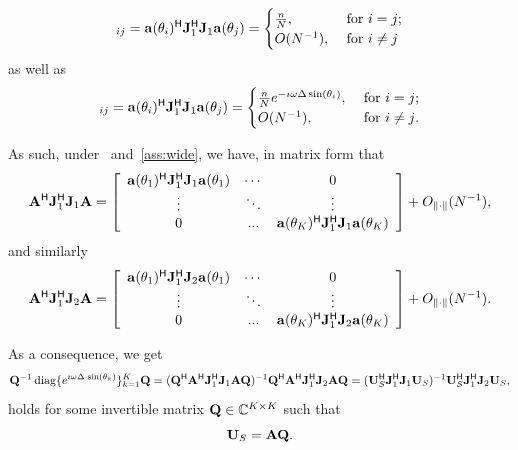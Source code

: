 \documentclass[11pt,a4paper]{article}
\begin{document}


\begin{equation}
    [\A^\H \J_1^\H \J_1 \A]_{ij} = \mathbf{a}(\theta_i)^\H \J_1^\H \J_1 \mathbf{a}(\theta_j) = \begin{cases}
        \frac{n}N, &~\text{for $i = j$}; \\ 
        O(N^{-1}), &~\text{for $i \neq j$}
    \end{cases}
\end{equation}
as well as
\begin{equation}
    [\A^\H \J_1^\H \J_2 \A]_{ij} = \mathbf{a}(\theta_i)^\H \J_1^\H \J_1 \mathbf{a}(\theta_j) = \begin{cases}
        \frac{n}N e^{-\imath \omega \Delta \sin(\theta_i)}, &~\text{for $i = j$}; \\ 
        O(N^{-1}), &~\text{for $i \neq j$}.
    \end{cases}
\end{equation}

As such, under ~and~\ref{ass:wide}, we have, in matrix form that 
\begin{equation}
 {\mathbf{A}}^{\sf H} {\mathbf{J}}_1^{\sf H} {\mathbf{J}}_1 {\mathbf{A}} = 
 \left[
 \begin{array}{ccc}
     \mathbf{a}(\theta_1)^{\sf H} {\mathbf{J}}_1^{\sf H} {\mathbf{J}}_1 \mathbf{a}(\theta_1) & \cdots & 0\\
     \vdots & \ddots &  \vdots\\
     0 & ... & \mathbf{a}(\theta_K)^{\sf H} {\mathbf{J}}_1^{\sf H} {\mathbf{J}}_1 \mathbf{a}(\theta_K)\\
 \end{array} 
 \right]     + O_{\| \cdot \|}(N^{-1}),   
 \end{equation}
 and similarly
\begin{equation}
 {\mathbf{A}}^{\sf H} {\mathbf{J}}_1^{\sf H} {\mathbf{J}}_2 {\mathbf{A}} = 
 \left[
 \begin{array}{ccc}
     \mathbf{a}(\theta_1)^{\sf H} {\mathbf{J}}_1^{\sf H} {\mathbf{J}}_2 \mathbf{a}(\theta_1) & \cdots & 0\\
     \vdots & \ddots &  \vdots\\
     0 & ... & \mathbf{a}(\theta_K)^{\sf H} {\mathbf{J}}_1^{\sf H} {\mathbf{J}}_2 \mathbf{a}(\theta_K)\\
 \end{array} 
 \right]     + O_{\| \cdot \|}(N^{-1}).   
 \end{equation}

As a consequence, we get
\begin{equation}
    {\mathbf{Q}}^{-1} \operatorname{diag}\{ e^{\imath \omega \Delta \cdot \sin(\theta_k)} \}_{k=1}^K {\mathbf{Q}} = ({\mathbf{Q}}^{\sf H} {\mathbf{A}}^{\sf H} {\mathbf{J}}_1^{\sf H} {\mathbf{J}}_1 {\mathbf{A}} {\mathbf{Q}} )^{-1} {\mathbf{Q}}^{\sf H} {\mathbf{A}}^{\sf H} {\mathbf{J}}_1^{\sf H} {\mathbf{J}}_2 {\mathbf{A}} {\mathbf{Q}} = ({\mathbf{U}}_S^{\sf H} {\mathbf{J}}_1^{\sf H} {\mathbf{J}}_1 {\mathbf{U}}_S )^{-1} {\mathbf{U}}_S^{\sf H} {\mathbf{J}}_1^{\sf H} {\mathbf{J}}_2 {\mathbf{U}}_S,
\end{equation}
holds for some invertible matrix ${\mathbf{Q}} \in {\mathbb{C}}^{K \times K}$ such that 
\begin{equation}
    {\mathbf{U}}_S = {\mathbf{A}} {\mathbf{Q}}.
\end{equation}
\end{document}
